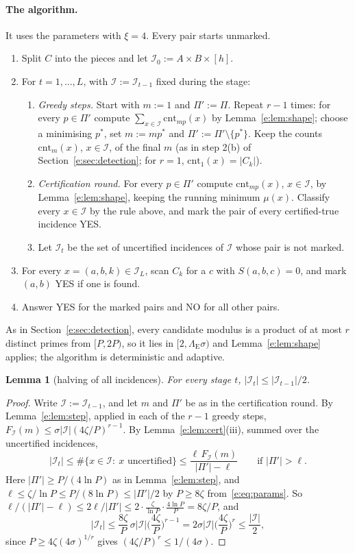 \documentclass[11pt]{article}
\newtheorem{lemma}[theorem]{Lemma}
\theoremstyle{definition}
\theoremstyle{remark}
\newcommand{\cnt}{\mathrm{cnt}}
\newcommand{\Iq}{\mathcal{I}}
\begin{document}
\paragraph{The algorithm.} It uses the parameters with $\xi=4$. Every pair starts unmarked.
\begin{enumerate}[label=\arabic*.]
\item Split $C$ into the pieces and let $\Iq_0:=A\times B\times[h]$.
\item For $t=1,\dots,L$, with $\Iq:=\Iq_{t-1}$ fixed during the stage:
\begin{enumerate}[label=(\alph*)]
\item \emph{Greedy steps.} Start with $m:=1$ and $\Pi':=\Pi$. Repeat $r-1$ times: for every $p\in\Pi'$ compute $\sum_{x\in\Iq}\cnt_{mp}(x)$ by Lemma~\ref{e:lem:shape}; choose a minimising $p^*$, set $m:=mp^*$ and $\Pi':=\Pi'\setminus\{p^*\}$. Keep the counts $\cnt_m(x)$, $x\in\Iq$, of the final $m$ (as in step 2(b) of Section~\ref{e:sec:detection}; for $r=1$, $\cnt_1(x)=|C_k|$).
\item \emph{Certification round.} For every $p\in\Pi'$ compute $\cnt_{mp}(x)$, $x\in\Iq$, by Lemma~\ref{e:lem:shape}, keeping the running minimum $\mu(x)$. Classify every $x\in\Iq$ by the rule above, and mark the pair of every certified-true incidence YES.
\item Let $\Iq_t$ be the set of uncertified incidences of $\Iq$ whose pair is not marked.
\end{enumerate}
\item For every $x=(a,b,k)\in\Iq_L$, scan $C_k$ for a $c$ with $S(a,b,c)=0$, and mark $(a,b)$ YES if one is found.
\item Answer YES for the marked pairs and NO for all other pairs.
\end{enumerate}
As in Section~\ref{e:sec:detection}, every candidate modulus is a product of at most $r$ distinct primes from $[P,2P)$, so it lies in $[2,\Lambda_{\mathrm E}\sigma)$ and Lemma~\ref{e:lem:shape} applies; the algorithm is deterministic and adaptive.

\begin{lemma}[halving of all incidences]\label{e:lem:halvingB}
For every stage $t$, $|\Iq_t|\le|\Iq_{t-1}|/2$.
\end{lemma}
\begin{proof}
Write $\Iq:=\Iq_{t-1}$, and let $m$ and $\Pi'$ be as in the certification round. By Lemma~\ref{e:lem:step}, applied in each of the $r-1$ greedy steps, $F_\Iq(m)\le\sigma|\Iq|(4\zeta/P)^{r-1}$. By Lemma~\ref{e:lem:cert}(iii), summed over the uncertified incidences,
\[
|\Iq_t|\le\#\{x\in\Iq:\ x\text{ uncertified}\}\le\frac{\ell\,F_\Iq(m)}{|\Pi'|-\ell}\qquad\text{if }|\Pi'|>\ell .
\]
Here $|\Pi'|\ge P/(4\ln P)$ as in Lemma~\ref{e:lem:step}, and $\ell\le\zeta/\ln P\le P/(8\ln P)\le|\Pi'|/2$ by $P\ge8\zeta$ from~\eqref{e:eq:params}. So $\ell/(|\Pi'|-\ell)\le2\ell/|\Pi'|\le2\cdot\frac{\zeta}{\ln P}\cdot\frac{4\ln P}{P}=8\zeta/P$, and
\[
|\Iq_t|\le\frac{8\zeta}{P}\,\sigma|\Iq|\Big(\frac{4\zeta}{P}\Big)^{r-1}=2\sigma|\Iq|\Big(\frac{4\zeta}{P}\Big)^r\le\frac{|\Iq|}{2},
\]
since $P\ge4\zeta(4\sigma)^{1/r}$ gives $(4\zeta/P)^r\le1/(4\sigma)$.
\end{proof}
\end{document}
